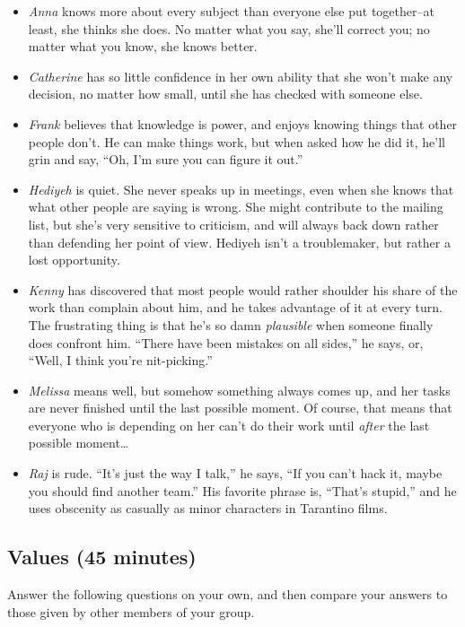 \documentclass[10pt,statementpaper]{memoir}
\begin{document}
\begin{itemize}
\item
  \emph{Anna} knows more about every subject than everyone else put
  together--at least, she thinks she does. No matter what you say,
  she'll correct you; no matter what you know, she knows better.
\item
  \emph{Catherine} has so little confidence in her own ability that she
  won't make any decision, no matter how small, until she has checked
  with someone else.
\item
  \emph{Frank} believes that knowledge is power, and enjoys knowing
  things that other people don't. He can make things work, but when
  asked how he did it, he'll grin and say, ``Oh, I'm sure you can figure
  it out.''
\item
  \emph{Hediyeh} is quiet. She never speaks up in meetings, even when
  she knows that what other people are saying is wrong. She might
  contribute to the mailing list, but she's very sensitive to criticism,
  and will always back down rather than defending her point of view.
  Hediyeh isn't a troublemaker, but rather a lost opportunity.
\item
  \emph{Kenny} has discovered that most people would rather shoulder his
  share of the work than complain about him, and he takes advantage of
  it at every turn. The frustrating thing is that he's so damn
  \emph{plausible} when someone finally does confront him. ``There have
  been mistakes on all sides,'' he says, or, ``Well, I think you're
  nit-picking.''
\item
  \emph{Melissa} means well, but somehow something always comes up, and
  her tasks are never finished until the last possible moment. Of
  course, that means that everyone who is depending on her can't do
  their work until \emph{after} the last possible moment\ldots{}
\item
  \emph{Raj} is rude. ``It's just the way I talk,'' he says, ``If you
  can't hack it, maybe you should find another team.'' His favorite
  phrase is, ``That's stupid,'' and he uses obscenity as casually as
  minor characters in Tarantino films.
\end{itemize}

\subsection{Values (45 minutes)}\label{values-45-minutes}

Answer the following questions on your own, and then compare your
answers to those given by other members of your group.
\end{document}
